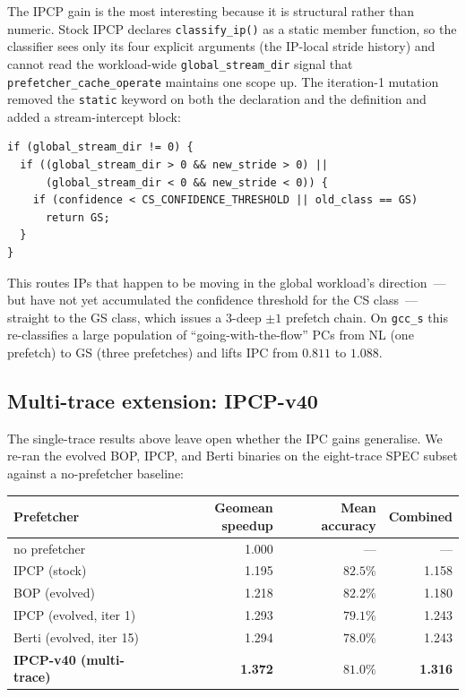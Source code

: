 \documentclass[11pt]{article}
\begin{document}
The IPCP gain is the most interesting because it is structural rather
than numeric. Stock IPCP declares \texttt{classify\_ip()} as a static
member function, so the classifier sees only its four explicit
arguments (the IP-local stride history) and cannot read the workload-wide
\texttt{global\_stream\_dir} signal that
\texttt{prefetcher\_cache\_operate} maintains one scope up. The
iteration-1 mutation removed the \texttt{static} keyword on both the
declaration and the definition and added a stream-intercept block:

\begin{lstlisting}
if (global_stream_dir != 0) {
  if ((global_stream_dir > 0 && new_stride > 0) ||
      (global_stream_dir < 0 && new_stride < 0)) {
    if (confidence < CS_CONFIDENCE_THRESHOLD || old_class == GS)
      return GS;
  }
}
\end{lstlisting}

This routes IPs that happen to be moving in the global workload's
direction~--- but have not yet accumulated the confidence threshold for
the CS class~--- straight to the GS class, which issues a 3-deep
$\pm 1$ prefetch chain. On \texttt{gcc\_s} this re-classifies a large
population of ``going-with-the-flow'' PCs from NL (one prefetch) to GS
(three prefetches) and lifts IPC from $0.811$ to $1.088$.

\subsection{Multi-trace extension: IPCP-v40}

The single-trace results above leave open whether the IPC gains
generalise. We re-ran the evolved BOP, IPCP, and Berti binaries on the
eight-trace SPEC subset against a no-prefetcher baseline:

\begin{center}\small
\begin{tabular}{l r r r}
\toprule
Prefetcher & Geomean speedup & Mean accuracy & Combined \\
\midrule
no prefetcher                       & 1.000  & ---     & ---   \\
IPCP (stock)                        & 1.195  & $82.5\%$ & 1.158 \\
BOP   (evolved)                     & 1.218  & $82.2\%$ & 1.180 \\
IPCP  (evolved, iter 1)             & 1.293  & $79.1\%$ & 1.243 \\
Berti (evolved, iter 15)            & 1.294  & $78.0\%$ & 1.243 \\
\textbf{IPCP-v40 (multi-trace)}     & \textbf{1.372}  & \textbf{$81.0\%$} & \textbf{1.316} \\
\bottomrule
\end{tabular}
\end{center}
\end{document}
